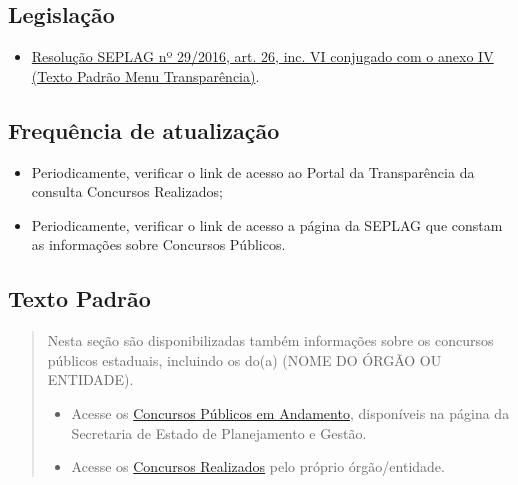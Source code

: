\documentclass[
]{book}
\providecommand{\tightlist}{%
  \setlength{\itemsep}{0pt}\setlength{\parskip}{0pt}}
\begin{document}
\hypertarget{legislauxe7uxe3o-9}{%
\subsection{Legislação}\label{legislauxe7uxe3o-9}}

\begin{itemize}
\tightlist
\item
  \href{http://www.planejamento.mg.gov.br/sites/default/files/documentos/resolucao_sitios_seplag_29_de_05_07_2016_1.pdf}{Resolução SEPLAG nº 29/2016, art. 26, inc. VI conjugado com o anexo IV (Texto Padrão Menu Transparência)}.
\end{itemize}

\hypertarget{frequuxeancia-de-atualizauxe7uxe3o-8}{%
\subsection{Frequência de atualização}\label{frequuxeancia-de-atualizauxe7uxe3o-8}}

\begin{itemize}
\tightlist
\item
  Periodicamente, verificar o link de acesso ao Portal da Transparência da consulta Concursos Realizados;
\item
  Periodicamente, verificar o link de acesso a página da SEPLAG que constam as informações sobre Concursos Públicos.
\end{itemize}

\hypertarget{texto-padruxe3o-9}{%
\subsection{Texto Padrão}\label{texto-padruxe3o-9}}

\begin{quote}
Nesta seção são disponibilizadas também informações sobre os concursos públicos estaduais, incluindo os do(a) (NOME DO ÓRGÃO OU ENTIDADE).

\begin{itemize}
\item
  Acesse os \href{http://www.planejamento.mg.gov.br/concursos-e-estagios/concursos-publicos}{Concursos Públicos em Andamento}, disponíveis na página da Secretaria de Estado de Planejamento e Gestão.
\item
  Acesse os \href{http://www.transparencia.mg.gov.br/estado-pessoal/concursos-realizados}{Concursos Realizados} pelo próprio órgão/entidade.
\end{itemize}
\end{quote}
\end{document}
